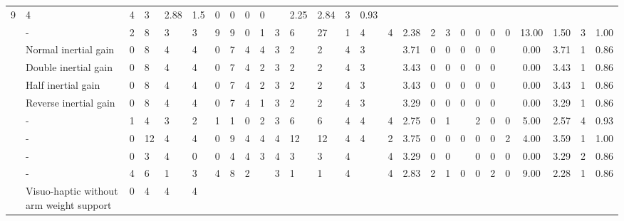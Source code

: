\begin{table}[htbp]
\begin{tabular}{lp{4cm}lllllllllllllllllllllcccc}
  9 &
  4 &
  4\footnotemark[33] &
  3\footnotemark[34] &
  2.88 &
  1.5 &
  0 &
  0 &
  0 &
  0 &
   &
  2.25 &
  2.84 &
  3 &
  0.93 \\
\cite{LiuH2019} &
  - &
  2 &
  8 &
  3 &
  3 &
  9 &
  9 &
  0 &
  1\footnotemark[35] &
  3 &
  6 &
  27 &
  1 &
  4\footnotemark[36] &
  4 &
  2.38 &
  2 &
  3\footnotemark[37] &
  0 &
  0 &
  0 &
  0 &
  13.00 &
  1.50 &
  3 &
  1.00 \\
\cite{Macuga2019} &
  Normal inertial gain &
  0 &
  8 &
  4 &
  4 &
  0 &
  7 &
  4 &
  4 &
  3 &
  2 &
  2 &
  4 &
  3\footnotemark[38] &
   &
  3.71 &
  0 &
  0 &
  0 &
  0 &
  0 &
   &
  0.00 &
  3.71 &
  1 &
  0.86 \\
\cite{Macuga2019} &
  Double inertial gain &
  0 &
  8 &
  4 &
  4 &
  0 &
  7 &
  4 &
  2 &
  3 &
  2 &
  2 &
  4 &
  3\footnotemark[38] &
   &
  3.43 &
  0 &
  0 &
  0 &
  0 &
  0 &
   &
  0.00 &
  3.43 &
  1 &
  0.86 \\
\cite{Macuga2019} &
  Half inertial gain &
  0 &
  8 &
  4 &
  4 &
  0 &
  7 &
  4 &
  2 &
  3 &
  2 &
  2 &
  4 &
  3\footnotemark[38] &
   &
  3.43 &
  0 &
  0 &
  0 &
  0 &
  0 &
   &
  0.00 &
  3.43 &
  1 &
  0.86 \\
\cite{Macuga2019} &
  Reverse inertial gain &
  0 &
  8 &
  4 &
  4 &
  0 &
  7 &
  4 &
  1 &
  3 &
  2 &
  2 &
  4 &
  3\footnotemark[38] &
   &
  3.29 &
  0 &
  0 &
  0 &
  0 &
  0 &
   &
  0.00 &
  3.29 &
  1 &
  0.86 \\
\cite{McAnally2023} &
  - &
  1 &
  4 &
  3 &
  2\footnotemark[39] &
  1 &
  1 &
  0 &
  2 &
  3 &
  6 &
  6 &
  4 &
  4 &
  4 &
  2.75 &
  0 &
  1\footnotemark[40] &
   &
  2\footnotemark[41] &
  0 &
  0 &
  5.00 &
  2.57 &
  4 &
  0.93 \\
\cite{Mohanty2023} &
  - &
  0 &
  12 &
  4 &
  4 &
  0 &
  9 &
  4 &
  4 &
  4 &
  12 &
  12 &
  4 &
  4 &
  2\footnotemark[42] &
  3.75 &
  0 &
  0 &
  0 &
  0 &
  0 &
  2 &
  4.00 &
  3.59 &
  1 &
  1.00 \\
\cite{Morris2007} &
  - &
  0 &
  3 &
  4 &
  0 &
  0 &
  4 &
  4 &
  3\footnotemark[43] &
  4 &
  3 &
  3 &
  4 &
   &
  4 &
  3.29 &
  0 &
  0 &
   &
  0 &
  0 &
  0 &
  0.00 &
  3.29 &
  2 &
  0.86 \\
\cite{Najdovski2020} &
  - &
  4 &
  6 &
  1 &
  3 &
  4 &
  8 &
  2 &
   &
  3 &
  1 &
  1 &
  4 &
   &
  4 &
  2.83 &
  2 &
  1 &
  0 &
  0 &
  2 &
  0 &
  9.00 &
  2.28 &
  1 &
  0.86 \\
\cite{Oezen2022} &
  Visuo-haptic without arm weight support &
  0 &
  4 &
  4 &
  4 &

\end{tabular}
\end{table}
